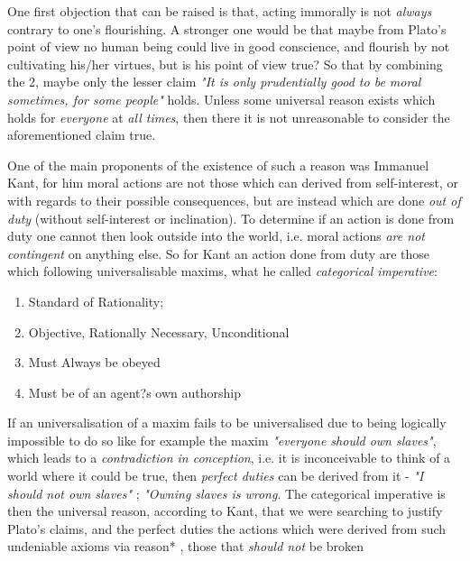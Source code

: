 \documentclass[english,course]{Notes}
\newcommand{\ita}[1]{\textit{#1}}
\begin{document}
\par{One first objection that can be raised is that, acting immorally is not \ita{always} contrary to one's flourishing. A stronger one would be that maybe from Plato's point of view no human being could live in good conscience, and flourish by not cultivating his/her virtues, but is his point of view true? So that  by combining the 2, maybe only the lesser claim \ita{"It is only prudentially good to be moral sometimes, for some people"} holds. Unless some universal reason exists which holds for \ita{everyone} at \ita{all times}, then there it is not unreasonable to consider the aforementioned claim true. }

\par{One of the main proponents of the existence of such a reason was Immanuel Kant, for him moral actions are not those which can derived from self-interest, or with regards to their possible consequences, but are instead which are done \ita{out of duty} (without self-interest or inclination). To determine if an action is done from duty one cannot then look outside into the world, i.e. moral actions \ita{are not contingent} on anything else. So for Kant an action done from duty are those which following universalisable maxims, what he called \ita{categorical imperative}:}
\begin{enumerate}
	\item Standard of Rationality;
	\item Objective, Rationally Necessary, Unconditional
	\item Must Always be obeyed
	\item Must be of an agent?s own authorship
\end{enumerate}

\par{If an universalisation of a maxim fails to be universalised due to being logically impossible to do so like for example the maxim \ita{"everyone should own slaves"}, which leads to a \ita{contradiction in conception}, i.e. it is inconceivable to think of a world where it could be true, then \ita{perfect duties} can be derived from it - \ita{"I should not own slaves"} ; \ita{"Owning slaves is wrong}. The categorical imperative is then the universal reason, according to Kant, that we were searching to justify Plato's claims, and the perfect duties the actions which were derived from such undeniable axioms via reason* , those that \ita{should not} be broken \\ }
	
\end{document}

